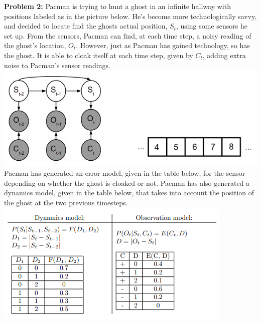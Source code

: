 \documentclass[a4paper]{article}
\begin{document}
    \noindent \textbf{Problem 2:} Pacman is trying to hunt a ghost in an infinite hallway with positions labeled as in the picture below. He’s become more technologically savvy, and decided to locate find the ghosts actual position, $S_t$, using some sensors he set up. From the sensors, Pacman can find, at each time step, a noisy reading of the ghost’s location, $O_t$. However, just as Pacman has gained technology, so has the ghost. It is able to cloak itself at each time step, given by $C_t$, adding extra noise to Pacman’s sensor readings.\\
    \includegraphics[scale=0.55]{figs/pacparticleprobhmm.png}\\
    Pacman has generated an error model, given in the table below, for the sensor depending on whether the ghost is cloaked or not. Pacman has also generated a dynamics model, given in the table below, that takes into account the position of the ghost at the two previous timesteps.\\
    \includegraphics[scale=0.5]{figs/pacparticleprobmodels.png}\\
\end{document}
